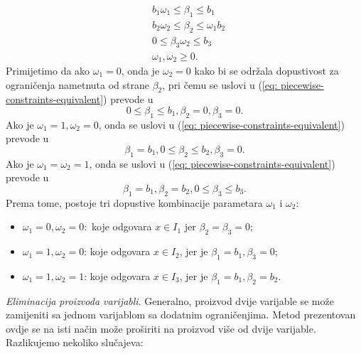 \documentclass[a4paper, utf8, 11pt, colorlinks]{book}
\begin{document}
\begin{align}
     & b_1 \omega_1 \leq \beta_1 \leq b_1   \nonumber \\
     & b_2 \omega_2 \leq \beta_2 \leq \omega_1 b_2 \nonumber \\
     & 0 \leq \beta_3  \omega_2 \leq b_3\nonumber \\
     & \omega_1, \omega_2 \geq 0. \label{eq: piecewise-constraints-equivalent}
\end{align}
      Primijetimo da ako $\omega_1 = 0$, onda je $\omega_2= 0$ kako bi se održala dopustivost za ograničenja nametnuta  od strane $\beta_2$, pri čemu se uslovi u (\ref{eq: piecewise-constraints-equivalent}) prevode u
      $$ 0 \leq \beta_1 \leq b_1, \beta_2 =0, \beta_3 =0.$$
      Ako je $\omega_1 = 1, \omega_2 = 0$, onda se uslovi u (\ref{eq: piecewise-constraints-equivalent}) prevode u
            $$   \beta_1 = b_1, 0 \leq \beta_2 \leq b_2, \beta_3 =0.$$
    Ako je $\omega_1 = \omega_2 = 1$, onda se  uslovi u (\ref{eq: piecewise-constraints-equivalent}) prevode u
    $$ \beta_1 = b_1, \beta_2 = b_2, 0 \leq \beta_3 \leq b_3.$$
    Prema tome, postoje tri dopustive kombinacije parametara $\omega_1$ i $\omega_2$:
    \begin{itemize}
             \item  $\omega_1 = 0, \omega_2= 0:$ koje odgovara $x \in I_1$ jer $\beta_2=\beta_3=0$;  
             \item $\omega_1 = 1, \omega_2 = 0$: koje odgovara $x\in I_2$, jer je $\beta_1=b_1, \beta_3=0$;
              \item $\omega_1 = 1, \omega_2 = 1$: koje odgovara $x\in I_3$, jer je $\beta_1=b_1, \beta_2=b_2$.
    \end{itemize}
 \emph{Eliminacija proizvoda varijabli}. Generalno, proizvod dvije varijable se može zamijeniti sa jednom varijablom sa dodatnim ograničenjima. Metod prezentovan ovdje se na isti način može proširiti na proizvod više od dvije varijable. Razlikujemo nekoliko slučajeva:
\end{document}
